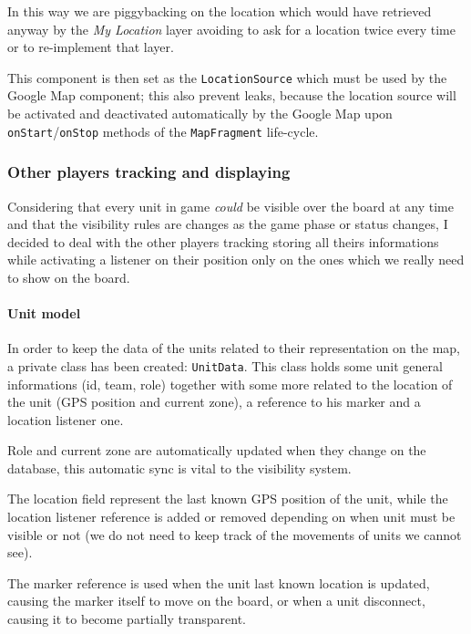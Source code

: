 			In this way we are piggybacking on the location which would have retrieved anyway by the \emph{My Location} layer avoiding to ask for a location twice every time or to re-implement that layer.
			
			This component is then set as the \lstinline|LocationSource| which must be used by the Google Map component; this also prevent leaks, because the location source will be activated and deactivated automatically by the Google Map upon \lstinline|onStart|/\lstinline|onStop| methods of the \lstinline|MapFragment| life-cycle.
			
			\subsubsection{Other players tracking and displaying}
			
			Considering that every unit in game \emph{could} be visible over the board at any time and that the visibility rules are changes as the game phase or status changes, I decided to deal with the other players tracking storing all theirs informations while activating a listener on their position only on the ones which we really need to show on the board.
			
				\paragraph{Unit model}
					
				In order to keep the data of the units related to their representation on the map, a private class has been created: \lstinline|UnitData|.
				This class holds some unit general informations (id, team, role) together with some more related to the location of the unit (GPS position and current zone), a reference to his marker and a location listener one.
				
				Role and current zone are automatically updated when they change on the database, this automatic sync is vital to the visibility system.
				
				The location field represent the last known GPS position of the unit, while the location listener reference is added or removed depending on when unit must be visible or not (we do not need to keep track of the movements of units we cannot see).
				
				The marker reference is used when the unit last known location is updated, causing the marker itself to move on the board, or when a unit disconnect, causing it to become partially transparent.
			
